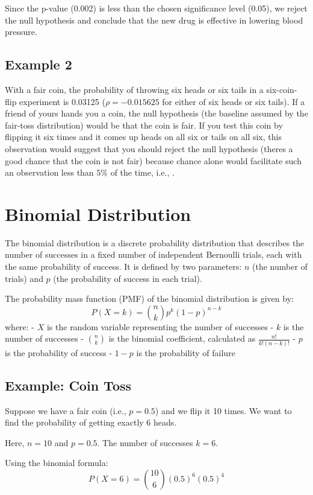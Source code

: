 \documentclass{article}
\begin{document}
Since the p-value (0.002) is less than the chosen significance level (0.05), we reject the null hypothesis and conclude that the new drug is effective in lowering blood pressure.

\subsection{Example 2}
With a fair coin, the probability of throwing six heads or six tails in a six-coin-flip experiment is 0.03125 (\(\rho=-0.015625\) for either of six heads or six tails). 
If a friend of yours hands you a coin, the null hypothesis (the baseline assumed by the fair-toss distribution) would be that the coin is fair. 
If you test this coin by flipping it six times and it comes up heads on all six or tails on all six, this observation would suggest that you should reject the null hypothesis (theres a good chance that the coin is not fair) because chance alone would facilitate such an observation less than \(5\%\) of the time, i.e., 
.

\section{Binomial Distribution}
The binomial distribution is a discrete probability distribution that describes the number of successes in a fixed number of independent Bernoulli trials, each with the same probability of success. It is defined by two parameters: \(n\) (the number of trials) and \(p\) (the probability of success in each trial).

The probability mass function (PMF) of the binomial distribution is given by:
\[
P(X = k) = \binom{n}{k} p^k (1 - p)^{n - k}
\]
where:
- \(X\) is the random variable representing the number of successes
- \(k\) is the number of successes
- \(\binom{n}{k}\) is the binomial coefficient, calculated as \(\frac{n!}{k!(n - k)!}\)
- \(p\) is the probability of success
- \(1 - p\) is the probability of failure

\subsection{Example: Coin Toss}
Suppose we have a fair coin (i.e., \(p = 0.5\)) and we flip it 10 times. We want to find the probability of getting exactly 6 heads.

Here, \(n = 10\) and \(p = 0.5\). The number of successes \(k = 6\).

Using the binomial formula:
\[
P(X = 6) = \binom{10}{6} (0.5)^6 (0.5)^{4}
\]
\end{document}
